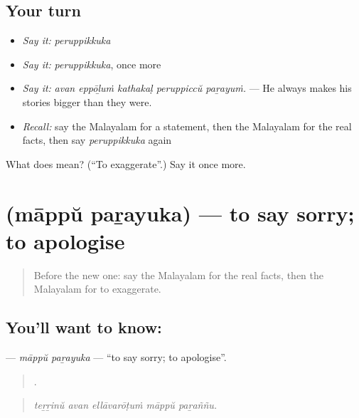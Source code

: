 \subsection*{Your turn}
\begin{itemize}
\raggedright
  \item \emph{Say it:} \emph{peruppikkuka}
  \item \emph{Say it:} \emph{peruppikkuka}, once more
  \item \emph{Say it:} \emph{avan eppōḻuṁ kathakaḷ peruppiccŭ paṟayuṁ.} — He always makes his stories bigger than they were.
  \item \emph{Recall:} say the Malayalam for a statement, then the Malayalam for the real facts, then say \emph{peruppikkuka} again
\end{itemize}

\begin{tcolorbox}[breakable,colback=teal!4,colframe=teal!35!black,title={Before you move on}]
What does  mean? (\textquotedblleft{}To exaggerate\textquotedblright{}.) Say it once more.
\end{tcolorbox}
\section[\texorpdfstring{\ml{മാപ്പ്} \ml{പറയുക} (māppŭ paṟayuka)}{മാപ്പ് പറയുക (māppŭ paṟayuka)}]{  (māppŭ paṟayuka) — to say sorry; to apologise}

\label{lesson:ML-C352-mappu-parayuka}



\begin{quote}
Before the new one: say the Malayalam for the real facts, then the Malayalam for to exaggerate.
\end{quote}

\subsection*{You'll want to know:  }
\textbf{ } — \emph{māppŭ paṟayuka} — \textquotedblleft{}to say sorry; to apologise\textquotedblright{}.

\begin{quote}
    .
\end{quote}

\begin{quote}
\emph{teṟṟinŭ avan ellāvarōṭuṁ māppŭ paṟaññu.}
\end{quote}

